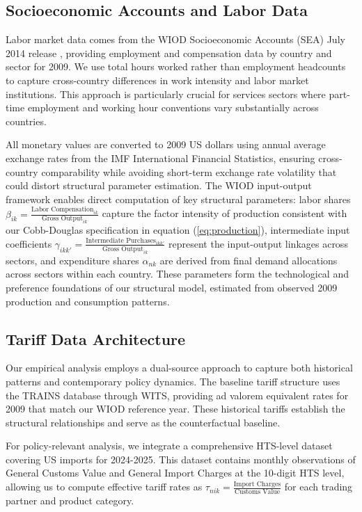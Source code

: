 

\subsection{Socioeconomic Accounts and Labor Data}

Labor market data comes from the WIOD Socioeconomic Accounts (SEA) July 2014 release \citep{timmer2015illustrated}, providing employment and compensation data by country and sector for 2009. We use total hours worked rather than employment headcounts to capture cross-country differences in work intensity and labor market institutions. This approach is particularly crucial for services sectors where part-time employment and working hour conventions vary substantially across countries.

All monetary values are converted to 2009 US dollars using annual average exchange rates from the IMF International Financial Statistics, ensuring cross-country comparability while avoiding short-term exchange rate volatility that could distort structural parameter estimation. The WIOD input-output framework enables direct computation of key structural parameters: labor shares $\beta_{ik} = \frac{\text{Labor Compensation}_{ik}}{\text{Gross Output}_{ik}}$ capture the factor intensity of production consistent with our Cobb-Douglas specification in equation (\ref{eq:production}), intermediate input coefficients $\gamma_{ikk'} = \frac{\text{Intermediate Purchases}_{ikk'}}{\text{Gross Output}_{ik}}$ represent the input-output linkages across sectors, and expenditure shares $\alpha_{nk}$ are derived from final demand allocations across sectors within each country. These parameters form the technological and preference foundations of our structural model, estimated from observed 2009 production and consumption patterns.

\subsection{Tariff Data Architecture}

Our empirical analysis employs a dual-source approach to capture both historical patterns and contemporary policy dynamics. The baseline tariff structure uses the TRAINS database through WITS, providing ad valorem equivalent rates for 2009 that match our WIOD reference year. These historical tariffs establish the structural relationships and serve as the counterfactual baseline.

For policy-relevant analysis, we integrate a comprehensive HTS-level dataset covering US imports for 2024-2025. This dataset contains monthly observations of General Customs Value and General Import Charges at the 10-digit HTS level, allowing us to compute effective tariff rates as $\tau_{nik} = \frac{\text{Import Charges}}{\text{Customs Value}}$ for each trading partner and product category.

